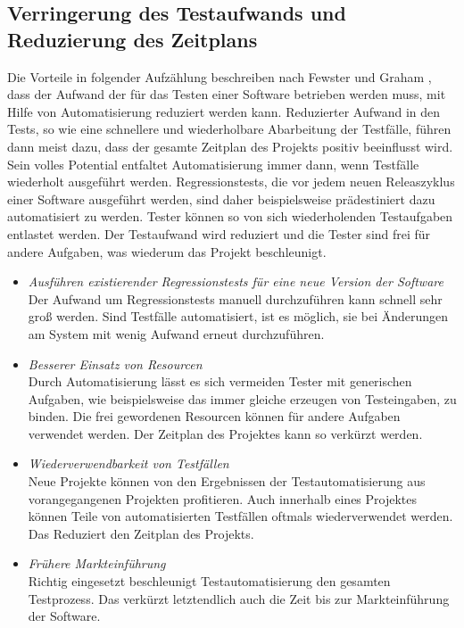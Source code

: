 \subsection{Verringerung des Testaufwands und Reduzierung des Zeitplans}
\label{sec:verringerung_des_testaufwands_und_reduzierung_des_zeitplans}
Die Vorteile in folgender Aufzählung beschreiben nach Fewster und Graham \cite[vgl. S. 9 ff.]{fewster_software_1999}, dass der Aufwand der für das Testen einer Software betrieben werden muss, mit Hilfe von Automatisierung reduziert werden kann.
Reduzierter Aufwand in den Tests, so wie eine schnellere und wiederholbare Abarbeitung der Testfälle, führen dann meist dazu, dass der gesamte Zeitplan des Projekts positiv beeinflusst wird. Sein volles Potential entfaltet Automatisierung immer dann, wenn Testfälle wiederholt ausgeführt werden. Regressionstests, die vor jedem neuen Releaszyklus einer Software ausgeführt werden, sind daher beispielsweise prädestiniert dazu automatisiert zu werden. Tester können so von sich wiederholenden Testaufgaben entlastet werden. Der Testaufwand wird reduziert und die Tester sind frei für andere Aufgaben, was wiederum das Projekt beschleunigt.

\begin{itemize}
\item \textit{Ausführen existierender Regressionstests für eine neue Version der Software} \\
Der Aufwand um Regressionstests manuell durchzuführen kann schnell sehr groß werden. Sind Testfälle automatisiert, ist es möglich, sie bei Änderungen am System mit wenig Aufwand erneut durchzuführen.
\item \textit{Besserer Einsatz von Resourcen} \\
Durch Automatisierung lässt es sich vermeiden Tester mit generischen Aufgaben, wie beispielsweise das immer gleiche erzeugen von Testeingaben, zu binden.
Die frei gewordenen Resourcen können für andere Aufgaben verwendet werden.
Der Zeitplan des Projektes kann so verkürzt werden. 
\item \textit{Wiederverwendbarkeit von Testfällen} \\
Neue Projekte können von den Ergebnissen der Testautomatisierung aus vorangegangenen Projekten profitieren. Auch innerhalb eines Projektes können Teile von automatisierten Testfällen oftmals wiederverwendet werden.
Das Reduziert den Zeitplan des Projekts.
\item \textit{Frühere Markteinführung} \\
Richtig eingesetzt beschleunigt Testautomatisierung den gesamten Testprozess. Das verkürzt letztendlich auch die Zeit bis zur Markteinführung der Software. 
\end{itemize}


